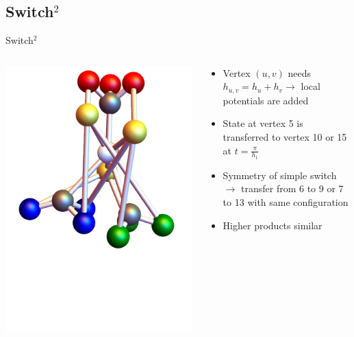 \documentclass{beamer}
\begin{document}
\subsection{Switch$^2$}
\begin{frame}{Switch$^2$}
	\begin{columns}[T]
		\begin{column}{0.5\textwidth}
			\centering
   			\includegraphics[trim=0mm 0 0 0mm, width=1.2\textwidth]{Images/switch_square}
		\end{column}
		\begin{column}{0.5\textwidth}
			\centering
    		\begin{itemize}
    			\item Vertex $(u,v)$ needs $h_{u,v} = h_u + h_v \rightarrow $ local potentials are added
    			\item State at vertex 5 is transferred to vertex 10 or 15 at $t = \frac{\pi}{h_1}$
    			\item Symmetry of simple switch $\rightarrow$ transfer from 6 to 9 or 7 to 13 with same configuration
    			\item Higher products similar
    		\end{itemize}
		\end{column}
	\end{columns}
\end{frame}
\end{document}
